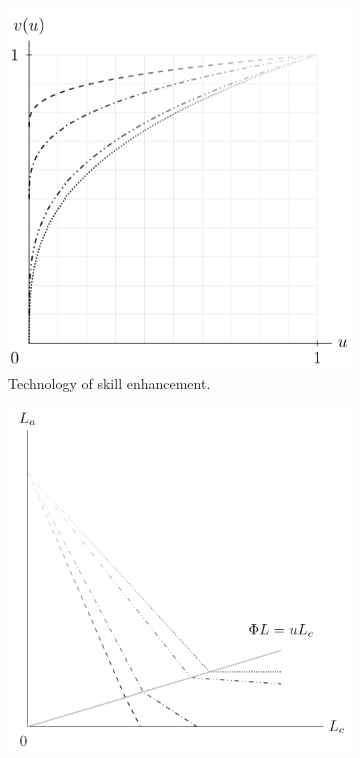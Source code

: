 \documentclass[a4paper,12pt]{article}
\theoremstyle{plain}
\theoremstyle{definition}
\theoremstyle{definition}
\theoremstyle{definition}
\theoremstyle{definition}
\begin{document}
\begin{figure}[t!]
    \centering
    \caption{Supervision, child productivity, and labour supply.}
    \begin{subfigure}[t]{0.45\textwidth}
        \includegraphics[width=\textwidth]{fig_skilltech}
        \caption{Technology of skill enhancement.}
    \end{subfigure}
    \hfill
    \begin{subfigure}[t]{0.45\textwidth}
        \includegraphics[width=\textwidth]{fig_isoquants}

\end{subfigure}
\end{figure}
\end{document}
